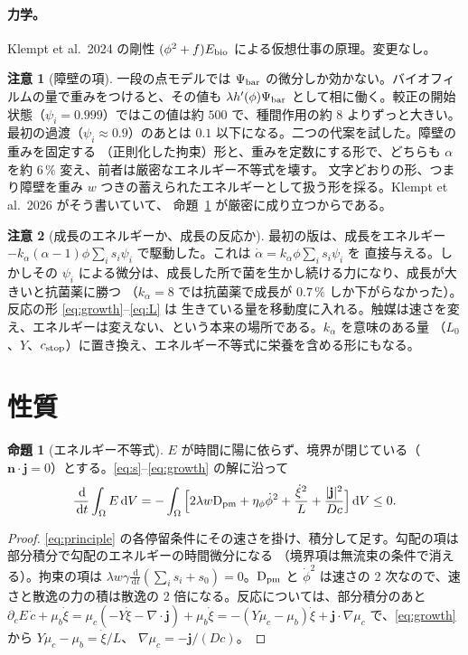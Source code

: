 \documentclass[11pt,a4paper]{article}
\theoremstyle{definition}
\newtheorem{proposition}{命題}
\newtheorem{remark}{注意}
\newcommand{\dd}{\,\mathrm{d}}
\newcommand{\D}{\mathrm{D}}
\newcommand{\living}{\textstyle\sum_i s_i\psi_i}
\begin{document}
\paragraph{力学。} Klempt et al.\ 2024 の剛性 $(\phi^2+f)E_{\rm bio}$ による仮想仕事の原理。変更なし。

\begin{remark}[障壁の項]\label{rem:barrier}
一段の点モデルでは $\Psi_{\rm bar}$ の微分しか効かない。バイオフィルムの量で重みをつけると、その値も
$\lambda h'(\phi)\Psi_{\rm bar}$ として相に働く。較正の開始状態（$\psi_i=0.999$）ではこの値は約 $500$ で、種間作用の約 $8$
よりずっと大きい。最初の過渡（$\psi_i\approx0.9$）のあとは $0.1$ 以下になる。二つの代案を試した。障壁の重みを固定する
（正則化した拘束）形と、重みを定数にする形で、どちらも $\alpha$ を約 $6\,\%$ 変え、前者は厳密なエネルギー不等式を壊す。
文字どおりの形、つまり障壁を重み $w$ つきの蓄えられたエネルギーとして扱う形を採る。Klempt et al.\ 2026 がそう書いていて、
命題~\ref{prop:energy} が厳密に成り立つからである。
\end{remark}

\begin{remark}[成長のエネルギーか、成長の反応か]\label{rem:catalyst}
最初の版は、成長をエネルギー $-k_\alpha(\alpha-1)\phi\living$ で駆動した。これは $\dot\alpha=k_\alpha\phi\living$ を
直接与える。しかしその $\psi_i$ による微分は、成長した所で菌を生かし続ける力になり、成長が大きいと抗菌薬に勝つ
（$k_\alpha=8$ では抗菌薬で成長が $0.7\,\%$ しか下がらなかった）。反応の形 \eqref{eq:growth}--\eqref{eq:L} は
生きている量を移動度に入れる。触媒は速さを変え、エネルギーは変えない、という本来の場所である。$k_\alpha$ を意味のある量
（$L_0$、$Y$、$c_{\rm stop}$）に置き換え、エネルギー不等式に栄養を含める形にもなる。
\end{remark}

\section{性質}

\begin{proposition}[エネルギー不等式]\label{prop:energy}
$E$ が時間に陽に依らず、境界が閉じている（$\mathbf n\cdot\mathbf j=0$）とする。\eqref{eq:s}--\eqref{eq:growth} の解に沿って
\[\frac{\dd}{\dd t}\int_\Omega E\dd V=-\int_\Omega\Big[2\lambda w\D_{\rm pm}+\eta_\phi\dot\phi^2
+\frac{\dot\xi^2}{L}+\frac{|\mathbf j|^2}{Dc}\Big]\dd V\le0 .\]
\end{proposition}
\begin{proof}
\eqref{eq:principle} の各停留条件にその速さを掛け、積分して足す。勾配の項は部分積分で勾配のエネルギーの時間微分になる
（境界項は無流束の条件で消える）。拘束の項は $\lambda w\gamma\frac{\dd}{\dd t}(\sum_is_i+s_0)=0$。$\D_{\rm pm}$ と
$\dot\phi^2$ は速さの 2 次なので、速さと散逸の力の積は散逸の 2 倍になる。反応については、部分積分のあと
$\partial_cE\,\dot c+\mu_b\dot\xi=\mu_c(-Y\dot\xi-\nabla\!\cdot\mathbf j)+\mu_b\dot\xi
=-(Y\mu_c-\mu_b)\dot\xi+\mathbf j\cdot\nabla\mu_c$ で、\eqref{eq:growth} から $Y\mu_c-\mu_b=\dot\xi/L$、
$\nabla\mu_c=-\mathbf j/(Dc)$。
\end{proof}
\end{document}
